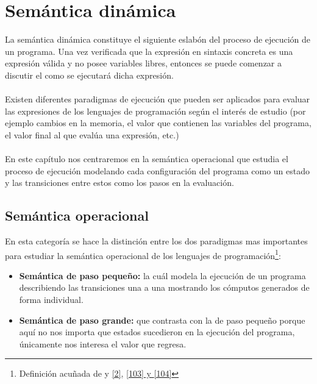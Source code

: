 \section{Semántica dinámica}
La semántica dinámica constituye el siguiente eslabón del proceso de ejecución de un programa. Una vez verificada que la expresión en sintaxis concreta es una expresión válida y no posee variables libres, entonces se puede comenzar a discutir el como se ejecutará dicha expresión. \\\\
   Existen diferentes paradigmas de ejecución que pueden ser aplicados para evaluar las expresiones de los lenguajes de programación según el interés de estudio (por ejemplo cambios en la memoria, el valor que contienen las variables del programa, el valor final al que evalúa una expresión, etc.) \\\\
En este capítulo nos centraremos en la semántica operacional que estudia el proceso de ejecución modelando cada configuración del programa como un estado y las transiciones entre estos como los pasos en la evaluación.

\subsection{Semántica operacional}
    En esta categoría se hace la distinción entre los dos paradigmas mas importantes para estudiar la semántica operacional de los lenguajes de programación\footnote{Definición acuñada de y  \hyperlink{2}{[2]}, \hyperlink{103}{[103] y  \hyperlink{104}{[104]}} }:
    \begin{itemize}
        \item \textbf{Semántica de paso pequeño:} la cuál modela la ejecución de un programa describiendo las transiciones una a una mostrando los cómputos generados de forma individual. 
        \item \textbf{Semántica de paso grande:} que contrasta con la de paso pequeño porque aquí no nos importa que estados sucedieron en la ejecución del programa, únicamente nos interesa el valor que regresa.
    \end{itemize}
    
